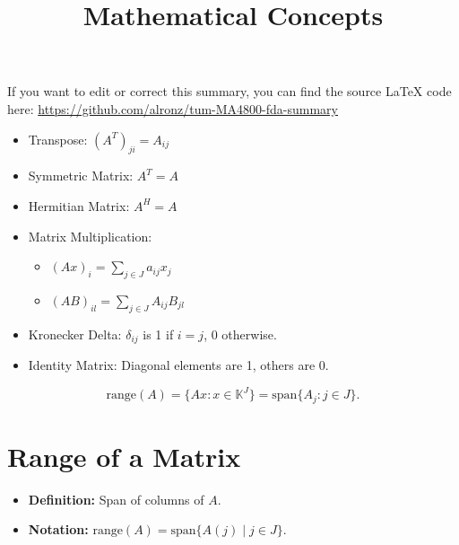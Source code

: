 \documentclass{article}
\begin{document}
    


\newpage
If you want to edit or correct this summary, you can find the source LaTeX code here: \href{https://github.com/alronz/tum-MA4800-fda-summary}{https://github.com/alronz/tum-MA4800-fda-summary}







\newpage
\begin{itemize}[leftmargin=*]
    \item Transpose: \( (A^T)_{ji} = A_{ij} \)
    \item Symmetric Matrix: \( A^T = A \)
    \item Hermitian Matrix: \( A^H = A \)
    \item Matrix Multiplication:
    \begin{itemize}[leftmargin=*]
        \item \( (Ax)_i = \sum_{j \in J} a_{ij}x_j \)
        \item \( (AB)_{il} = \sum_{j \in J} A_{ij}B_{jl} \)
    \end{itemize}
    \item Kronecker Delta: \( \delta_{ij} \) is 1 if \( i = j \), 0 otherwise.
    \item Identity Matrix: Diagonal elements are 1, others are 0.
\end{itemize}









\[
\text{range}(A) = \{Ax : x \in \mathbb{K}^J\} = \text{span}\{A_j : j \in J\}.
\]










\title{Mathematical Concepts}
\author{}
\date{}



\maketitle

\section*{Range of a Matrix}
\begin{itemize}
    \item \textbf{Definition:} Span of columns of \( A \).
    \item \textbf{Notation:} \( \text{range}(A) = \text{span}\{A(j) \mid j \in J\} \).
\end{itemize}
\end{document}
